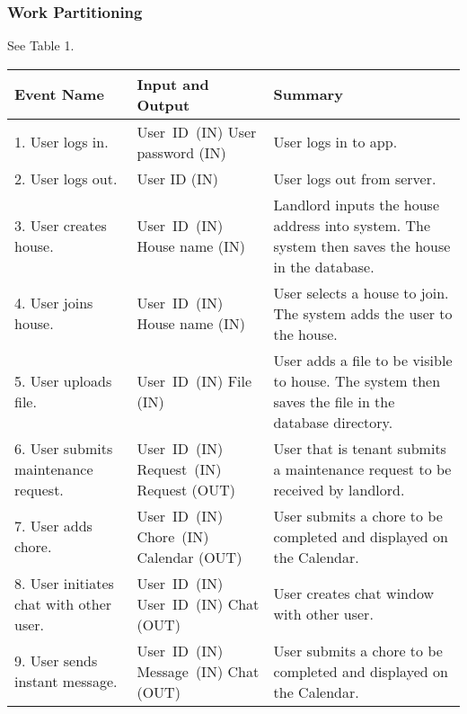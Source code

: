 \documentclass[12pt, titlepage]{article}
\begin{document}
\subsubsection{Work Partitioning} 
See Table 1.
\begin{table}
\begin{tabular}{|p{5cm}|p{5cm}|p{5cm}|}
\hline
\textbf{Event Name}  & \textbf{Input and Output} & \textbf{Summary} \\ 
\hline
1. User logs in. & \mbox{User ID (IN)} \linebreak User password (IN) & User logs in to app. \\ 
\hline
2. User logs out. & User ID (IN) & User logs out from server. \\
\hline
3. User creates house. & \mbox{User ID (IN)} \linebreak House name (IN) & Landlord inputs the house address into system. The system then saves the house in the database. \\
\hline
4. User joins house. & \mbox{User ID (IN)} \linebreak House name (IN) & User selects a house to join. The system adds the user to the house. \\
\hline
5. User uploads file. & \mbox{User ID (IN)} \linebreak File (IN) & User adds a file to be visible to house. The system then saves the file in the database directory. \\
\hline
6. User submits maintenance request. & \mbox{User ID (IN)} \linebreak \mbox{Request (IN)} \linebreak Request (OUT) & User that is tenant submits a maintenance request to be received by landlord. \\
\hline
7. User adds chore. & \mbox{User ID (IN)} \linebreak \mbox{Chore (IN)} \linebreak Calendar (OUT) & User submits a chore to be completed and displayed on the Calendar. \\
\hline
8. User initiates chat with other user. & \mbox{User ID (IN)} \linebreak \mbox{User ID (IN)} \linebreak Chat (OUT) & User creates chat window with other user. \\
\hline
9. User sends instant message. & \mbox{User ID (IN)} \linebreak \mbox{Message (IN)} \linebreak Chat (OUT) & User submits a chore to be completed and displayed on the Calendar. \\

\end{tabular}
\end{table}
\end{document}
